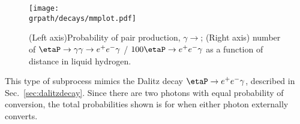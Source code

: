 \begin{figure}[h!]\begin{center}
		\texttt{[image: \\grpath/decays/mmplot.pdf]}
		\caption[Probability of pair production, $\gamma \to$\epem, as a function of distance in liquid hydrogen]{\label{fig:conversionmm}{(Left axis)Probability of pair production, $\gamma \to$\epem; (Right axis) number of $\etaP \to \gamma \gamma \rightarrow e^+e^- \gamma$ / $100 \etaP \rightarrow e^+e^- \gamma$ as a function of distance in liquid hydrogen.}}
	\end{center}\end{figure}
This type of subprocess mimics the Dalitz decay  $\etaP \to e^+e^- \gamma$, described in Sec.~\ref{sec:dalitzdecay}. Since there are two photons with equal probability of conversion, the total probabilities shown is for when either photon externally converts.



